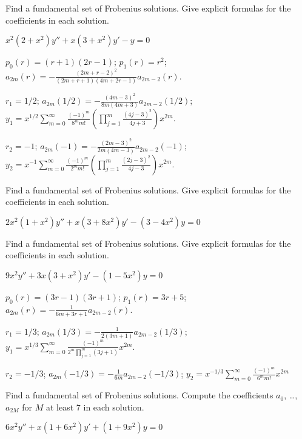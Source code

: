 \documentclass{ximera}
\begin{document}
\begin{problem}\label{exer:7.5.44} 
Find a
fundamental set of Frobenius solutions. Give explicit formulas for
the coefficients in each solution.

$x^2(2+x^2)y''+x(3+x^2)y'-y=0$

\begin{solution}
    $p_0(r)=(r+1)(2r-1)$;
$p_1(r)=r^2$;
$a_{2m}(r)=-\frac{(2m+r-2)^2}{(2m+r+1)(4m+2r-1)}a_{2m-2}(r)$.

$r_1=1/2$;
$a_{2m}(1/2)=-\frac{(4m-3)^2}{8m(4m+3)}a_{2m-2}(1/2)$;
$y_1=x^{1/2}\sum_{m=0}^\infty\frac{(-1)^m}{8^mm!}\left(\prod_{j=1}^m
\frac{(4j-3)^2}{4j+3}\right)x^{2m}$.

$r_2=-1$;
$a_{2m}(-1)=-\frac{(2m-3)^2}{2m(4m-3)}a_{2m-2}(-1)$;
$y_2=x^{-1}\sum_{m=0}^\infty\frac{(-1)^m}{2^mm!}\left(\prod_{j=1}^m
\frac{(2j-3)^2}{4j-3}\right)x^{2m}$.
\end{solution}
\end{problem}

\begin{problem}\label{exer:7.5.45} 
Find a
fundamental set of Frobenius solutions. Give explicit formulas for
the coefficients in each solution.

$2x^2(1+x^2)y''+x(3+8x^2)y'-(3-4x^2)y=0$
\end{problem}

\begin{problem}\label{exer:7.5.46} 
Find a
fundamental set of Frobenius solutions. Give explicit formulas for
the coefficients in each solution.

$9x^2y''+3x(3+x^2)y'-(1-5x^2)y=0$

\begin{solution}
    $p_0(r)=(3r-1)(3r+1)$;
$p_1(r)=3r+5$;
$a_{2m}(r)=-\frac{1}{6m+3r+1}a_{2m-2}(r)$.

$r_1=1/3$;
$a_{2m}(1/3)=-\frac{1}{2(3m+1)}a_{2m-2}(1/3)$;
$y_1=x^{1/3}\sum_{m=0}^\infty\frac{(-1)^m}{2^m\prod_{j=1}^m(3j+1)}x^{2m}$.

$r_2=-1/3$;
$a_{2m}(-1/3)=-\frac{1}{6m}a_{2m-2}(-1/3)$;
$y_2=x^{-1/3}\sum_{m=0}^\infty\frac{(-1)^m}{6^mm!} x^{2m}$

\end{solution}
\end{problem}


\begin{problem}\label{exer:7.5.47}
Find a
fundamental set of Frobenius solutions. Compute  the
coefficients $a_0$, \dots, $a_{2M}$ for $M$ at least $7$ in each
solution.

$6x^2y''+x(1+6x^2)y'+(1+9x^2)y=0$
\end{problem}
\end{document}
